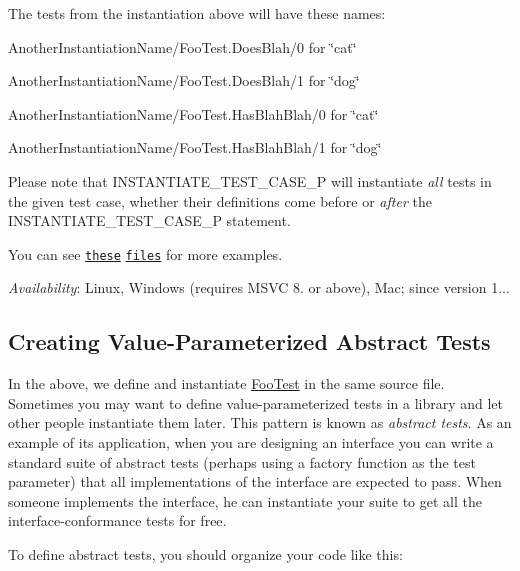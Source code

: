The tests from the instantiation above will have these names\+:


\begin{DoxyItemize}
\item {\ttfamily Another\+Instantiation\+Name/\+Foo\+Test.\+Does\+Blah/0} for {\ttfamily \char`\"{}cat\char`\"{}}
\item {\ttfamily Another\+Instantiation\+Name/\+Foo\+Test.\+Does\+Blah/1} for {\ttfamily \char`\"{}dog\char`\"{}}
\item {\ttfamily Another\+Instantiation\+Name/\+Foo\+Test.\+Has\+Blah\+Blah/0} for {\ttfamily \char`\"{}cat\char`\"{}}
\item {\ttfamily Another\+Instantiation\+Name/\+Foo\+Test.\+Has\+Blah\+Blah/1} for {\ttfamily \char`\"{}dog\char`\"{}}
\end{DoxyItemize}

Please note that {\ttfamily I\+N\+S\+T\+A\+N\+T\+I\+A\+T\+E\+\_\+\+T\+E\+S\+T\+\_\+\+C\+A\+S\+E\+\_\+P} will instantiate {\itshape all} tests in the given test case, whether their definitions come before or {\itshape after} the {\ttfamily I\+N\+S\+T\+A\+N\+T\+I\+A\+T\+E\+\_\+\+T\+E\+S\+T\+\_\+\+C\+A\+S\+E\+\_\+P} statement.

You can see \href{../samples/sample7_unittest.cc}{\tt these} \href{../samples/sample8_unittest.cc}{\tt files} for more examples.

{\itshape Availability}\+: Linux, Windows (requires M\+S\+VC 8. or above), Mac; since version 1...

\subsection*{Creating Value-\/\+Parameterized Abstract Tests}

In the above, we define and instantiate {\ttfamily \hyperlink{classFooTest}{Foo\+Test}} in the same source file. Sometimes you may want to define value-\/parameterized tests in a library and let other people instantiate them later. This pattern is known as {\itshape abstract tests}. As an example of its application, when you are designing an interface you can write a standard suite of abstract tests (perhaps using a factory function as the test parameter) that all implementations of the interface are expected to pass. When someone implements the interface, he can instantiate your suite to get all the interface-\/conformance tests for free.

To define abstract tests, you should organize your code like this\+:


